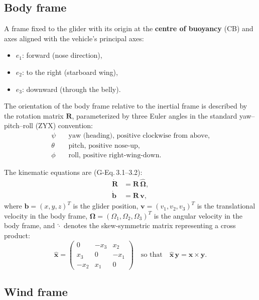 \documentclass[11pt,a4paper]{article}
\newcommand{\vect}[1]{\bm{#1}}
\newcommand{\mat}[1]{\mathbf{#1}}
\begin{document}
\subsection{Body frame}

A frame fixed to the glider with its origin at the \textbf{centre of buoyancy} (CB)
and axes aligned with the vehicle's principal axes:
\begin{itemize}[nosep]
  \item $e_1$: forward (nose direction),
  \item $e_2$: to the right (starboard wing),
  \item $e_3$: downward (through the belly).
\end{itemize}

The orientation of the body frame relative to the inertial frame is described by the
rotation matrix $\mat{R}$, parameterized by three Euler angles in the standard
yaw--pitch--roll (ZYX) convention:
\begin{align}
  \psi &\quad\text{yaw (heading), positive clockwise from above}, \\
  \theta &\quad\text{pitch, positive nose-up}, \\
  \phi &\quad\text{roll, positive right-wing-down}.
\end{align}

The kinematic equations are (G-Eq.\,3.1--3.2):
\begin{align}
  \dot{\mat{R}} &= \mat{R}\,\hat{\vect{\Omega}}, \label{eq:Rdot} \\
  \dot{\vect{b}} &= \mat{R}\,\vect{v}, \label{eq:bdot}
\end{align}
where $\vect{b}=(x,y,z)^T$ is the glider position, $\vect{v}=(v_1,v_2,v_3)^T$ is the
translational velocity in the body frame, $\vect{\Omega}=(\Omega_1,\Omega_2,\Omega_3)^T$
is the angular velocity in the body frame, and $\hat{\cdot}$ denotes the skew-symmetric
matrix representing a cross product:
\begin{equation}
  \hat{\vect{x}} = \begin{pmatrix} 0 & -x_3 & x_2 \\ x_3 & 0 & -x_1 \\ -x_2 & x_1 & 0 \end{pmatrix}
  \quad\text{so that}\quad \hat{\vect{x}}\,\vect{y} = \vect{x}\times\vect{y}.
\end{equation}

\subsection{Wind frame}
\end{document}
